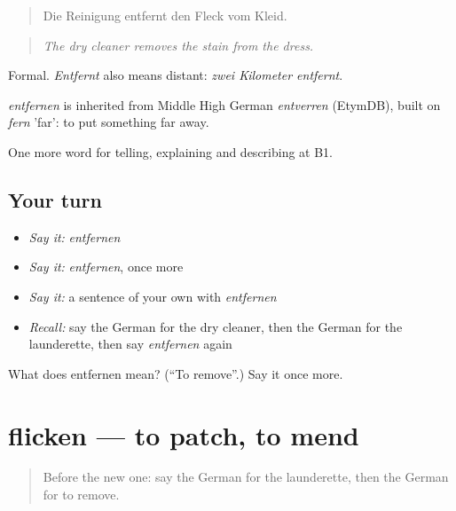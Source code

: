\begin{quote}
Die Reinigung entfernt den Fleck vom Kleid.
\end{quote}

\begin{quote}
\emph{The dry cleaner removes the stain from the dress.}
\end{quote}

Formal. \emph{Entfernt} also means distant: \emph{zwei Kilometer entfernt}.

\begin{cousinweb}
\emph{entfernen} is inherited from Middle High German \emph{entverren} (EtymDB), built on \emph{fern} 'far': to put something far away.
\end{cousinweb}

\begin{grammarlens}[title={What you've built}]
One more word for telling, explaining and describing at B1.
\end{grammarlens}

\subsection*{Your turn}
\begin{itemize}
\raggedright
  \item \emph{Say it:} \emph{entfernen}
  \item \emph{Say it:} \emph{entfernen}, once more
  \item \emph{Say it:} a sentence of your own with \emph{entfernen}
  \item \emph{Recall:} say the German for the dry cleaner, then the German for the launderette, then say \emph{entfernen} again
\end{itemize}

\begin{tcolorbox}[breakable,colback=teal!4,colframe=teal!35!black,title={Before you move on}]
What does entfernen mean? (\textquotedblleft{}To remove\textquotedblright{}.) Say it once more.
\end{tcolorbox}
\section[flicken]{flicken — to patch, to mend}

\label{lesson:GE-C446-flicken}



\begin{quote}
Before the new one: say the German for the launderette, then the German for to remove.
\end{quote}

